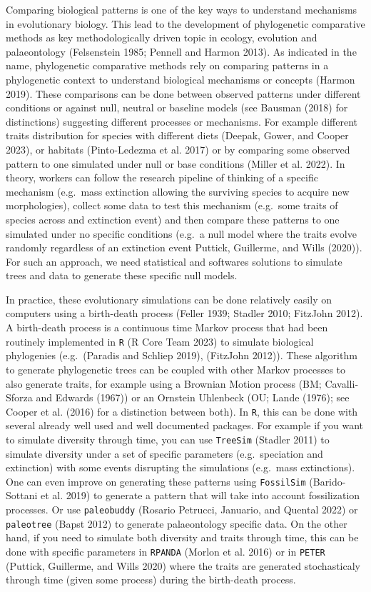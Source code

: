 \documentclass[
]{article}
\begin{document}
Comparing biological patterns is one of the key ways to understand
mechanisms in evolutionary biology. This lead to the development of
phylogenetic comparative methods as key methodologically driven topic in
ecology, evolution and palaeontology (Felsenstein 1985; Pennell and
Harmon 2013). As indicated in the name, phylogenetic comparative methods
rely on comparing patterns in a phylogenetic context to understand
biological mechanisms or concepts (Harmon 2019). These comparisons can
be done between observed patterns under different conditions or against
null, neutral or baseline models (see Bausman (2018) for distinctions)
suggesting different processes or mechanisms. For example different
traits distribution for species with different diets (Deepak, Gower, and
Cooper 2023), or habitats (Pinto-Ledezma et al. 2017) or by comparing
some observed pattern to one simulated under null or base conditions
(Miller et al. 2022). In theory, workers can follow the research
pipeline of thinking of a specific mechanism (e.g.~mass extinction
allowing the surviving species to acquire new morphologies), collect
some data to test this mechanism (e.g.~some traits of species across and
extinction event) and then compare these patterns to one simulated under
no specific conditions (e.g.~a null model where the traits evolve
randomly regardless of an extinction event Puttick, Guillerme, and Wills
(2020)). For such an approach, we need statistical and softwares
solutions to simulate trees and data to generate these specific null
models.

In practice, these evolutionary simulations can be done relatively
easily on computers using a birth-death process (Feller 1939; Stadler
2010; FitzJohn 2012). A birth-death process is a continuous time Markov
process that had been routinely implemented in \texttt{R} (R Core Team
2023) to simulate biological phylogenies (e.g.~(Paradis and Schliep
2019), (FitzJohn 2012)). These algorithm to generate phylogenetic trees
can be coupled with other Markov processes to also generate traits, for
example using a Brownian Motion process (BM; Cavalli-Sforza and Edwards
(1967)) or an Ornstein Uhlenbeck (OU; Lande (1976); see Cooper et al.
(2016) for a distinction between both). In \texttt{R}, this can be done
with several already well used and well documented packages. For example
if you want to simulate diversity through time, you can use
\texttt{TreeSim} (Stadler 2011) to simulate diversity under a set of
specific parameters (e.g.~speciation and extinction) with some events
disrupting the simulations (e.g.~mass extinctions). One can even improve
on generating these patterns using \texttt{FossilSim} (Barido-Sottani et
al. 2019) to generate a pattern that will take into account
fossilization processes. Or use \texttt{paleobuddy} (Rosario Petrucci,
Januario, and Quental 2022) or \texttt{paleotree} (Bapst 2012) to
generate palaeontology specific data. On the other hand, if you need to
simulate both diversity and traits through time, this can be done with
specific parameters in \texttt{RPANDA} (Morlon et al. 2016) or in
\texttt{PETER} (Puttick, Guillerme, and Wills 2020) where the traits are
generated stochasticaly through time (given some process) during the
birth-death process.
\end{document}
